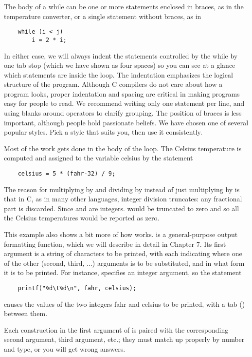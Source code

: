 The body of a while can be one or more statements enclosed in braces, as in the temperature converter, or a single statement without braces, as in
\begin{lstlisting}
	while (i < j)
		i = 2 * i;
\end{lstlisting}
In either case, we will always indent the statements controlled by the while by one tab stop (which we have shown as four spaces) so you can see at a glance which statements are inside the loop.
The indentation emphasizes the logical structure of the program.
Although C compilers do not care about how a program looks, proper indentation and spacing are critical in making programs easy for people to read.
We recommend writing only one statement per line, and using blanks around operators to clarify grouping.
The position of braces is less important, although people hold passionate beliefs.
We have chosen one of several popular styles. Pick a style that suits you, then use it consistently.

Most of the work gets done in the body of the loop.
The Celsius temperature is computed and assigned to the variable celsius by the statement
\begin{lstlisting}
	celsius = 5 * (fahr-32) / 9;
\end{lstlisting}
The reason for multiplying by  and dividing by  instead of just multiplying by  is that in C, as in many other languages, integer division truncates: any fractional part is discarded.
Since  and  are integers.  would be truncated to zero and so all the Celsius temperatures would be reported as zero.

This example also shows a bit more of how  works.
 is a general-purpose output formatting function, which we will describe in detail in Chapter 7.
Its first argument is a string of characters to be printed, with each \code{\%} indicating where one of the other (second, third, ...) arguments is to be substituted, and in what form it is to be printed.
For instance,  specifies an integer argument, so the statement
\begin{lstlisting}
	printf("%d\t%d\n", fahr, celsius);
\end{lstlisting}
causes the values of the two integers fahr and celsius to be printed, with a tab () between them.

Each \code{\%} construction in the first argument of  is paired with the corresponding second argument, third argument, etc.; they must match up properly by number and type, or you will get wrong answers.

